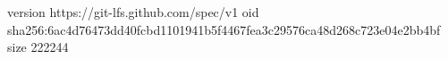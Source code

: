 version https://git-lfs.github.com/spec/v1
oid sha256:6ac4d76473dd40fcbd1101941b5f4467fea3c29576ca48d268c723e04e2bb4bf
size 222244

